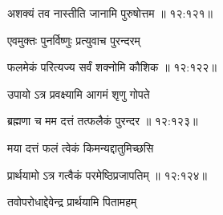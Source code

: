 {\devanagarifont अशक्यं तव नास्तीति जानामि पुरुषोत्तम {॥ १२:१२१॥} \veg\dontdisplaylinenum }%

{\devanagarifont एवमुक्तः पुनर्विष्णुः प्रत्युवाच पुरन्दरम् \thinspace{\dandab} \dontdisplaylinenum }%


{\devanagarifont फलमेकं परित्यज्य सर्वं शक्नोमि कौशिक {॥ १२:१२२॥} \veg\dontdisplaylinenum }%

{\devanagarifont उपायो ऽत्र प्रवक्ष्यामि आगमं शृणु गोपते \thinspace{\dandab} \dontdisplaylinenum }%
 

{\devanagarifont ब्रह्मणा च मम दत्तं तत्फलैकं पुरन्दर {॥ १२:१२३॥} \veg\dontdisplaylinenum }%

{\devanagarifont मया दत्तं फलं त्वेकं किमन्यद्दातुमिच्छसि \thinspace{\dandab} \dontdisplaylinenum }%


{\devanagarifont प्रार्थयामो ऽत्र गत्वैकं परमेष्ठिप्रजापतिम् {॥ १२:१२४॥} \veg\dontdisplaylinenum  }%

{\devanagarifont तवोपरोधाद्देवेन्द्र प्रार्थयामि पितामहम् \thinspace{\dandab} \dontdisplaylinenum }%


